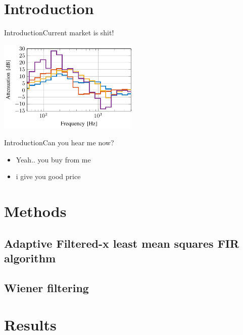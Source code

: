 \section{Introduction}

\begin{frame}{Introduction}{Current market is shit!}		

\begin{center}
	\includegraphics[width=0.5\textwidth]{figures/ComparedConusmerHP}
\end{center}


\end{frame}

\begin{frame}{Introduction}{Can you hear me now?}		
	\begin{itemize}
		\item Yeah.. you buy from me
		\item i give you good price
	\end{itemize}	
\end{frame}





\section{Methods}







\subsection{Adaptive Filtered-x least mean squares FIR algorithm}

\subsection{Wiener filtering}

\section{Results}

